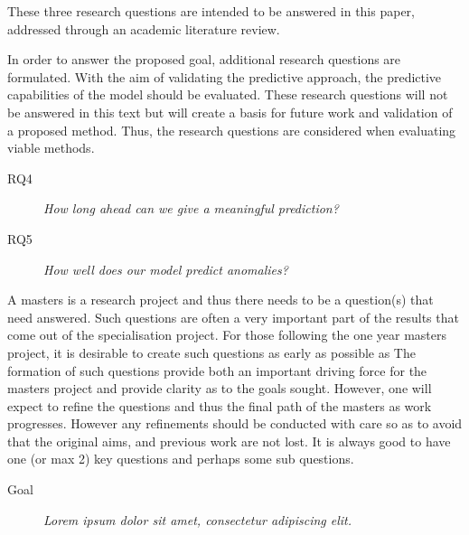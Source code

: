 These three research questions are intended to be answered in this paper, addressed through an academic literature review.
\newline


In order to answer the proposed goal, additional research questions are formulated.
With the aim of validating the predictive approach, the predictive capabilities of the model should be evaluated.
These research questions will not be answered in this text but will create a basis for future work and validation of a proposed method.
Thus, the research questions are considered when evaluating viable methods.

\begin{description}
    \item[RQ4]{\it How long ahead can we give a meaningful prediction?}
\end{description}

\begin{description}
    \item[RQ5]{\it How well does our model predict anomalies?}
\end{description}




\iffalse
    A masters is a research project and thus there needs to be a question(s) that need answered.
    Such questions are often a very important part of the results that come out of the specialisation project.
    For those following the one year masters project, it is desirable to create such questions as early as possible as   The formation of such questions provide both an important driving force for the masters project and provide clarity as to the goals sought. However, one will expect to refine the questions and thus the final path of the masters as work progresses. However any refinements should be conducted with care so as to avoid that the original aims, and previous work are not lost.
    It is always good to have one (or max 2) key questions and perhaps some sub questions.

    \begin{description}
        \item[Goal] {\it Lorem ipsum dolor sit amet, consectetur adipiscing elit.}
    \end{description}

